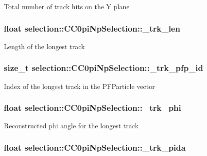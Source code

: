 Total number of track hits on the Y plane \hypertarget{classselection_1_1CC0piNpSelection_aab7945993678b44d7100abac6cc71655}{
\subsubsection[{\-\_\-trk\-\_\-len}]{\setlength{\rightskip}{0pt plus 5cm}float selection\-::\-C\-C0pi\-Np\-Selection\-::\-\_\-trk\-\_\-len\hspace{0.3cm}{\ttfamily [private]}}}\label{classselection_1_1CC0piNpSelection_aab7945993678b44d7100abac6cc71655}
Length of the longest track \hypertarget{classselection_1_1CC0piNpSelection_a641e7e656a28a5b31a5c8ab21dad9d3b}{
\subsubsection[{\-\_\-trk\-\_\-pfp\-\_\-id}]{\setlength{\rightskip}{0pt plus 5cm}size\-\_\-t selection\-::\-C\-C0pi\-Np\-Selection\-::\-\_\-trk\-\_\-pfp\-\_\-id\hspace{0.3cm}{\ttfamily [private]}}}\label{classselection_1_1CC0piNpSelection_a641e7e656a28a5b31a5c8ab21dad9d3b}
Index of the longest track in the P\-F\-Particle vector \hypertarget{classselection_1_1CC0piNpSelection_a85a6029e249e3ff20ea6d8eaabf22142}{
\subsubsection[{\-\_\-trk\-\_\-phi}]{\setlength{\rightskip}{0pt plus 5cm}float selection\-::\-C\-C0pi\-Np\-Selection\-::\-\_\-trk\-\_\-phi\hspace{0.3cm}{\ttfamily [private]}}}\label{classselection_1_1CC0piNpSelection_a85a6029e249e3ff20ea6d8eaabf22142}
Reconstructed phi angle for the longest track \hypertarget{classselection_1_1CC0piNpSelection_af0fe49227e33b3f46015a821de58ba1f}{
\subsubsection[{\-\_\-trk\-\_\-pida}]{\setlength{\rightskip}{0pt plus 5cm}float selection\-::\-C\-C0pi\-Np\-Selection\-::\-\_\-trk\-\_\-pida\hspace{0.3cm}{\ttfamily [private]}}}\label{classselection_1_1CC0piNpSelection_af0fe49227e33b3f46015a821de58ba1f}
